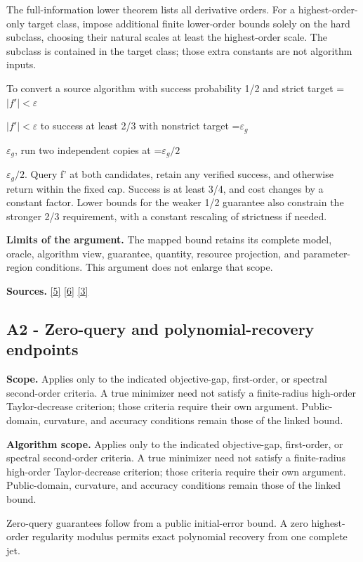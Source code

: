 \documentclass[10pt,a4paper]{article}
\newcommand{\AtlasMath}[1]{\par\begingroup\centering\setbox0=\hbox{$\displaystyle #1$}\ifdim\wd0>1.4\linewidth\typeout{ATLAS WIDE FORMULA: \the\wd0}\fi\ifdim\wd0>\linewidth\resizebox{\linewidth}{!}{\box0}\else\box0\fi\par\endgroup}
\newcommand{\AtlasInlineMath}[1]{\begingroup\setbox0=\hbox{$#1$}\ifdim\wd0>.4\linewidth\endgroup\AtlasMath{#1}\else\endgroup$#1$\fi}
\begin{document}
The full-information lower theorem lists all derivative orders. For a highest-order-only target class, impose additional finite lower-order bounds solely on the hard subclass, choosing their natural scales at least the highest-order scale. The subclass is contained in the target class; those extra constants are not algorithm inputs.

To convert a source algorithm with success probability 1/2 and strict target \AtlasInlineMath{|f'|<\varepsilon} to success at least 2/3 with nonstrict target \AtlasInlineMath{\varepsilon_g}, run two independent copies at \AtlasInlineMath{\varepsilon_g/2}. Query f' at both candidates, retain any verified success, and otherwise return within the fixed cap. Success is at least 3/4, and cost changes by a constant factor. Lower bounds for the weaker 1/2 guarantee also constrain the stronger 2/3 requirement, with a constant rescaling of strictness if needed.

\textbf{Limits of the argument.} The mapped bound retains its complete model, oracle, algorithm view, guarantee, quantity, resource projection, and parameter-region conditions. This argument does not enlarge that scope.

\textbf{Sources.} \href{https://arxiv.org/abs/1710.11606v3}{[5]} \href{https://arxiv.org/abs/1811.01220}{[6]} \href{https://arxiv.org/abs/2610.16295}{[3]}

\subsection{A2 - Zero-query and polynomial-recovery endpoints}
\textbf{Scope.} Applies only to the indicated objective-gap, first-order, or spectral second-order criteria. A true minimizer need not satisfy a finite-radius high-order Taylor-decrease criterion; those criteria require their own argument. Public-domain, curvature, and accuracy conditions remain those of the linked bound.

\textbf{Algorithm scope.} Applies only to the indicated objective-gap, first-order, or spectral second-order criteria. A true minimizer need not satisfy a finite-radius high-order Taylor-decrease criterion; those criteria require their own argument. Public-domain, curvature, and accuracy conditions remain those of the linked bound.

Zero-query guarantees follow from a public initial-error bound. A zero highest-order regularity modulus permits exact polynomial recovery from one complete jet.
\end{document}
